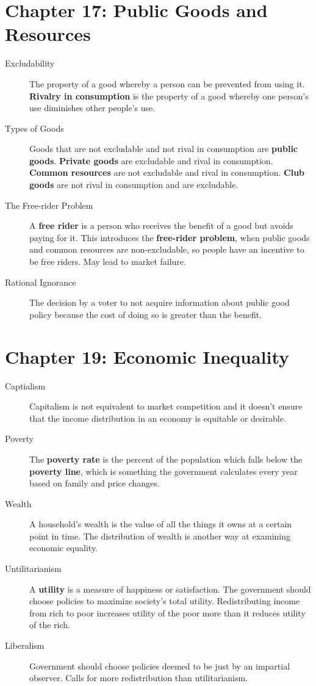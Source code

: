 \documentclass{article}
\begin{document}
\section*{Chapter 17: Public Goods and Resources}
\begin{description}
    \item[Excludability] The property of a good whereby a person can be prevented from using it. \textbf{Rivalry in consumption} is the property of a good whereby one person's use diminishes other people's use. 
    \item[Types of Goods] Goods that are not excludable and not rival in consumption are \textbf{public goods}. \textbf{Private goods} are excludable and rival in consumption. \textbf{Common resources} are not excludable and rival in consumption. \textbf{Club goods} are not rival in consumption and are excludable.
    \item[The Free-rider Problem] A \textbf{free rider} is a person who receives the benefit of a good but avoids paying for it. This introduces the \textbf{free-rider problem}, when public goods and common resources are non-excludable, so people have an incentive to be free riders. May lead to market failure.
    \item[Rational Ignorance] The decision by a voter to not acquire information about public good policy because the cost of doing so is greater than the benefit. 
\end{description}
\section*{Chapter 19: Economic Inequality}
\begin{description}
    \item[Captialism] Capitalism is not equivalent to market competition and it doesn't ensure that the income distribution in an economy is equitable or desirable.
    \item[Poverty] The \textbf{poverty rate} is the percent of the population which falls below the \textbf{poverty line}, which is something the government calculates every year based on family and price changes. 
    \item[Wealth] A household's wealth is the value of all the things it owns at a certain point in time. The distribution of wealth is another way at examining economic equality.
    \item[Untilitarianism] A \textbf{utility} is a measure of happiness or satisfaction. The government should choose policies to maximize society's total utility. Redistributing income from rich to poor increases utility of the poor more than it reduces utility of the rich.
    \item[Liberalism] Government should choose policies deemed to be just by an impartial observer. Calls for more redistribution than utilitarianism.
\end{description}
\end{document}
